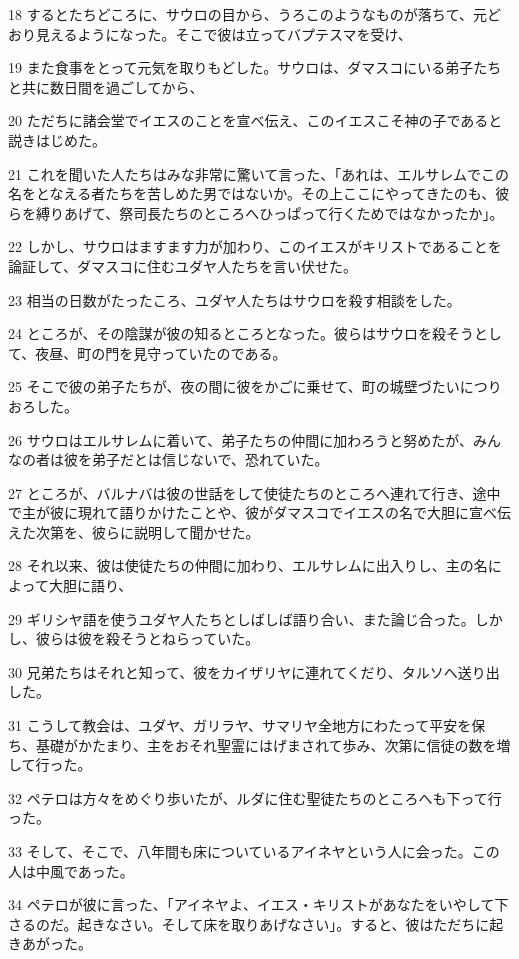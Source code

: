 \par 18 するとたちどころに、サウロの目から、うろこのようなものが落ちて、元どおり見えるようになった。そこで彼は立ってバプテスマを受け、
\par 19 また食事をとって元気を取りもどした。サウロは、ダマスコにいる弟子たちと共に数日間を過ごしてから、
\par 20 ただちに諸会堂でイエスのことを宣べ伝え、このイエスこそ神の子であると説きはじめた。
\par 21 これを聞いた人たちはみな非常に驚いて言った、「あれは、エルサレムでこの名をとなえる者たちを苦しめた男ではないか。その上ここにやってきたのも、彼らを縛りあげて、祭司長たちのところへひっぱって行くためではなかったか」。
\par 22 しかし、サウロはますます力が加わり、このイエスがキリストであることを論証して、ダマスコに住むユダヤ人たちを言い伏せた。
\par 23 相当の日数がたったころ、ユダヤ人たちはサウロを殺す相談をした。
\par 24 ところが、その陰謀が彼の知るところとなった。彼らはサウロを殺そうとして、夜昼、町の門を見守っていたのである。
\par 25 そこで彼の弟子たちが、夜の間に彼をかごに乗せて、町の城壁づたいにつりおろした。
\par 26 サウロはエルサレムに着いて、弟子たちの仲間に加わろうと努めたが、みんなの者は彼を弟子だとは信じないで、恐れていた。
\par 27 ところが、バルナバは彼の世話をして使徒たちのところへ連れて行き、途中で主が彼に現れて語りかけたことや、彼がダマスコでイエスの名で大胆に宣べ伝えた次第を、彼らに説明して聞かせた。
\par 28 それ以来、彼は使徒たちの仲間に加わり、エルサレムに出入りし、主の名によって大胆に語り、
\par 29 ギリシヤ語を使うユダヤ人たちとしばしば語り合い、また論じ合った。しかし、彼らは彼を殺そうとねらっていた。
\par 30 兄弟たちはそれと知って、彼をカイザリヤに連れてくだり、タルソへ送り出した。
\par 31 こうして教会は、ユダヤ、ガリラヤ、サマリヤ全地方にわたって平安を保ち、基礎がかたまり、主をおそれ聖霊にはげまされて歩み、次第に信徒の数を増して行った。
\par 32 ペテロは方々をめぐり歩いたが、ルダに住む聖徒たちのところへも下って行った。
\par 33 そして、そこで、八年間も床についているアイネヤという人に会った。この人は中風であった。
\par 34 ペテロが彼に言った、「アイネヤよ、イエス・キリストがあなたをいやして下さるのだ。起きなさい。そして床を取りあげなさい」。すると、彼はただちに起きあがった。
